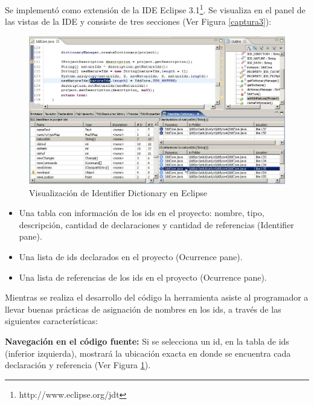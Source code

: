 Se implementó como extensión de la IDE Eclipse 3.1\footnote[2]{http://www.eclipse.org/jdt}. Se visualiza en el panel de las vistas de la IDE y consiste de tres secciones (Ver Figura \ref{captura3}):

\begin{figure}[t] %
\centerline{%
\includegraphics[scale= 0.50]{./cap3/idd_3.png}
}
\caption{Visualización de Identifier Dictionary en Eclipse}
\label{captura4}
\end{figure} 

\begin{itemize}
\itemsep0em%
\item Una tabla con información de los ids en el proyecto: nombre, tipo, descripción, cantidad de declaraciones y cantidad de referencias (Identifier pane).
\item Una lista de ids declarados en el proyecto (Ocurrence pane).
\item Una lista de referencias de los ids en el proyecto (Ocurrence pane).
\end{itemize}

Mientras se realiza el desarrollo del código la herramienta asiste al programador a llevar buenas prácticas de asignación de nombres en los ids, a través de las siguientes características:

\textbf{Navegación en el código fuente:} Si se selecciona un id, en la tabla de ids (inferior izquierda), mostrará la ubicación exacta en donde se encuentra cada declaración y referencia (Ver Figura \ref{captura4}).

%

